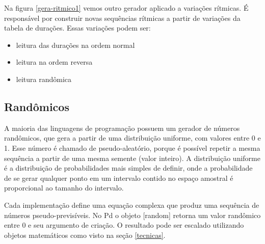 \documentclass[draft]{ppgmus}
\begin{document}
Na figura \ref{gera-ritmico1} vemos outro gerador aplicado
a variações rítmicas.
É responsável por construir novas sequências rítmicas a partir de variações
da tabela de durações. Essas variações podem ser:
\begin{itemize}
 \item leitura das durações na ordem normal
 \item leitura na ordem reversa
 \item leitura randômica
\end{itemize}




\subsection{Randômicos}



A maioria das linguagens de programação possuem um 
gerador de números randômicos, que gera a partir de uma distribuição uniforme, com valores entre 0 e 1. 
Esse número é chamado de pseudo-aleatório, porque é possível repetir a mesma sequência a partir de uma 
mesma semente (valor inteiro). A distribuição uniforme é a distribuição de probabilidades  
mais simples de definir, onde a probabilidade de se gerar qualquer ponto em um intervalo contido no 
espaço amostral é proporcional ao tamanho do intervalo.

Cada implementação define uma equação complexa que produz uma sequência de números
pseudo-previsíveis. No Pd o objeto [random] retorna um valor randômico entre 0 e seu argumento
de criação. O resultado pode ser escalado utilizando objetos matemáticos como visto na seção \ref{tecnicas}.
 
\end{document}
